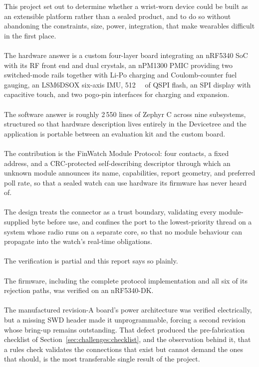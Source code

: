 \documentclass[12pt, a4paper]{article}
\begin{document}
This project set out to determine whether a wrist-worn device could be built as
an extensible platform rather than a sealed product, and to do so without
abandoning the constraints, size, power, integration, that make wearables
difficult in the first place.\\\\
%
The hardware answer is a custom four-layer board integrating an nRF5340 SoC with
its RF front end and dual crystals, an nPM1300 PMIC providing two switched-mode
rails together with Li-Po charging and Coulomb-counter fuel gauging, an
LSM6DSOX six-axis IMU, \SI{512}{\mega\bit} of QSPI flash, an
SPI display with capacitive touch, and two pogo-pin interfaces for charging and
expansion.\\\\
The software answer is roughly 2\,550 lines of Zephyr C across nine
subsystems, structured so that hardware description lives entirely in the
Devicetree and the application is portable between an evaluation kit and the
custom board.\\\\
%
The contribution is the FinWatch Module Protocol: four contacts, a fixed 
address, and a CRC-protected self-describing descriptor through which an unknown
module announces its name, capabilities, report geometry, and preferred poll
rate, so that a sealed watch can use hardware its firmware has never heard
of.\\\\
The design treats the connector as a trust boundary, validating every
module-supplied byte before use, and confines the port to the lowest-priority
thread on a system whose radio runs on a separate core, so that no module
behaviour can propagate into the watch's real-time obligations.\\\\
The verification is partial and this report says so plainly.\\\\ 
The firmware, including the complete protocol implementation and all six of its rejection
paths, was verified on an nRF5340-DK. \\\\ 
The manufactured revision-A board's power architecture was verified electrically, but a missing SWD header made it
unprogrammable, forcing a second revision whose bring-up remains outstanding.
That defect produced the pre-fabrication checklist of
Section~\ref{sec:challenges:checklist}, and the observation behind it, that a
rules check validates the connections that exist but cannot demand the ones that
should, is the most transferable single result of the project.
\end{document}
